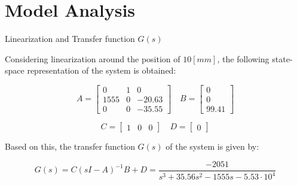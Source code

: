 \section{Model Analysis}

\begin{frame}{Linearization and Transfer function $G(s)$}

    Considering linearization around the position of $10 [mm]$, the following state-space representation of the system is obtained:

    \begin{equation}
        A =
        \begin{bmatrix}
            0    & 1 & 0      \\
            1555 & 0 & -20.63 \\
            0    & 0 & -35.55
        \end{bmatrix}
        \quad
        B =
        \begin{bmatrix}
            0 \\
            0 \\
            99.41
        \end{bmatrix}
    \end{equation}

    \begin{equation}
        C =
        \begin{bmatrix}
            1 & 0 & 0
        \end{bmatrix}
        \quad
        D =
        \begin{bmatrix}
            0
        \end{bmatrix}
    \end{equation}

    Based on this, the transfer function $G(s)$ of the system is given by:

    \begin{equation}
        G(s) = C \left( sI - A \right)^{-1} B + D = \frac{-2051}{s^3 + 35.56 s^2 - 1555 s - 5.53\cdot10^4}
    \end{equation}

\end{frame}



